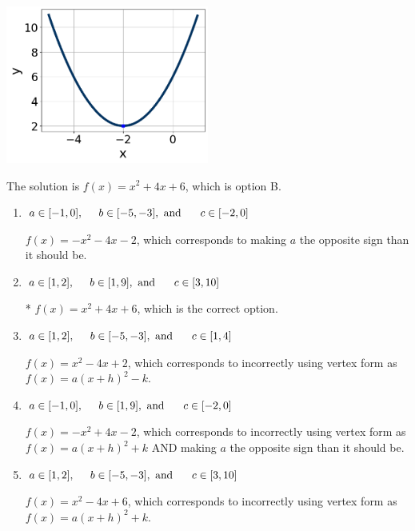 \documentclass{extbook}[14pt]
\begin{document}
\begin{enumerate}
{\begin{center}
    \includegraphics[width=0.5\textwidth]{../Figures/quadraticGraphToEquationCopyB.png}
\end{center}


The solution is \( f(x) = x^{2} +4 x + 6 \), which is option B.\begin{enumerate}[label=\Alph*.]
\item \( a \in [-1, 0], \hspace*{5mm} b \in [-5, -3], \text{ and } \hspace*{5mm} c \in [-2, 0] \)

$f(x)=-x^{2} -4 x -2$, which corresponds to making $a$ the opposite sign than it should be.
\item \( a \in [1, 2], \hspace*{5mm} b \in [1, 9], \text{ and } \hspace*{5mm} c \in [3, 10] \)

* $f(x)=x^{2} +4 x + 6$, which is the correct option.
\item \( a \in [1, 2], \hspace*{5mm} b \in [-5, -3], \text{ and } \hspace*{5mm} c \in [1, 4] \)

$f(x)=x^{2} -4 x + 2$, which corresponds to incorrectly using vertex form as $f(x) = a(x+h)^2 - k$.
\item \( a \in [-1, 0], \hspace*{5mm} b \in [1, 9], \text{ and } \hspace*{5mm} c \in [-2, 0] \)

$f(x)=-x^{2} +4 x -2$, which corresponds to incorrectly using vertex form as $f(x) = a(x+h)^2+k$ AND making $a$ the opposite sign than it should be.
\item \( a \in [1, 2], \hspace*{5mm} b \in [-5, -3], \text{ and } \hspace*{5mm} c \in [3, 10] \)

$f(x)=x^{2} -4 x + 6$, which corresponds to incorrectly using vertex form as $f(x) = a(x+h)^2+k$.
\end{enumerate}

}
\end{enumerate}
\end{document}
